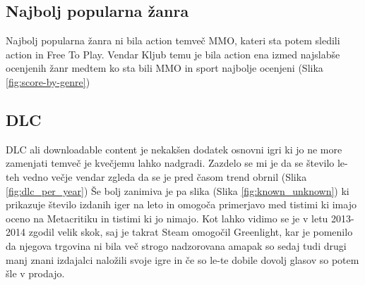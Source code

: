 \documentclass[a4paper]{article}
\begin{document}
\subsection{Najbolj popularna žanra}
Najbolj popularna žanra ni bila action temveč MMO, kateri  sta potem sledili action in Free To Play.
Vendar Kljub temu je bila action ena izmed najslabše ocenjenih žanr medtem ko sta bili MMO in sport najbolje ocenjeni (Slika \ref{fig:score-by-genre})

\subsection{DLC}
DLC ali downloadable content je nekakšen dodatek osnovni igri ki jo ne more zamenjati temveč je kvečjemu lahko  nadgradi. Zazdelo se mi je da se  število le-teh vedno večje vendar zgleda da se je pred časom trend obrnil  (Slika \ref{fig:dlc_per_year})
Še bolj zanimiva je pa slika  (Slika \ref{fig:known_unknown}) ki prikazuje število izdanih iger na leto in omogoča primerjavo med tistimi ki imajo oceno na Metacritiku in tistimi ki jo nimajo. Kot lahko vidimo se je v letu 2013-2014 zgodil velik skok,
saj je takrat Steam omogočil Greenlight, kar je pomenilo da njegova trgovina ni bila več strogo nadzorovana amapak so sedaj tudi drugi manj znani izdajalci naložili svoje igre in če so le-te dobile dovolj glasov so potem šle v prodajo.
\end{document}
